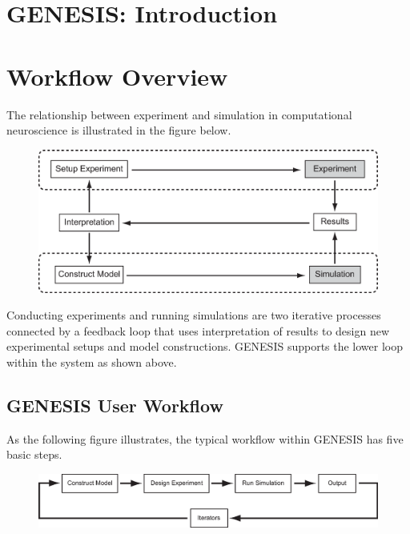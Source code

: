 \documentclass[12pt]{article}
\begin{document}
\section*{GENESIS: Introduction}

\section*{Workflow Overview}

The relationship between experiment and simulation in computational neuroscience is illustrated in the figure below.  

\begin{figure}[h]
   \centering
   \includegraphics[scale=0.4]{figures/Exp-Sim-8.eps}
   \label{fig:df-1}
\end{figure}

Conducting experiments and running simulations are two iterative processes connected by a feedback loop that uses interpretation of results to design new experimental setups and model constructions. GENESIS supports the lower loop within the system as shown above.

\subsection*{GENESIS User Workflow}

As the following figure illustrates, the typical workflow within GENESIS has five basic steps. 

\begin{figure}[h]
   \centering
   \includegraphics[scale=0.5]{figures/workflow.eps}
   \label{fig:df-1}
\end{figure}
\end{document}

